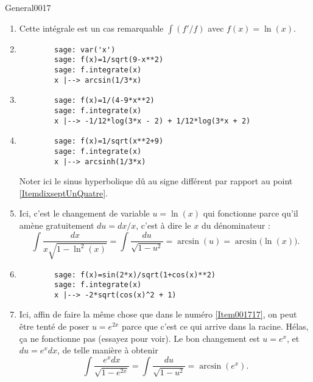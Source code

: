 \begin{corrige}{General0017}
\begin{enumerate}
\item
Cette intégrale est un cas remarquable $\int (f'/f)$ avec $f(x)=\ln(x)$.

\item\label{ItemdixseptUnQuatre}
	
	\begin{verbatim}
		sage: var('x')
		sage: f(x)=1/sqrt(9-x**2)
		sage: f.integrate(x)
		x |--> arcsin(1/3*x)
	\end{verbatim}


\item
	\begin{verbatim}
		sage: f(x)=1/(4-9*x**2)
		sage: f.integrate(x)   
		x |--> -1/12*log(3*x - 2) + 1/12*log(3*x + 2)
	\end{verbatim}
\item

	\begin{verbatim}
		sage: f(x)=1/sqrt(x**2+9)
		sage: f.integrate(x)     
		x |--> arcsinh(1/3*x)
	\end{verbatim}
	Noter ici le sinus hyperbolique dû au signe différent par rapport au point \ref{ItemdixseptUnQuatre}.
\item\label{Item001717}
Ici, c'est le changement de variable $u=\ln(x)$ qui fonctionne parce qu'il amène gratuitement $du=dx/x$, c'est à dire le $x$ du dénominateur :
\begin{equation}
	\int\frac{ dx }{ x\sqrt{1-\ln^2(x)} }=\int\frac{ du }{ \sqrt{1-u^2} }=\arcsin(u)=\arcsin\big( \ln(x) \big).
\end{equation}

\item

	\begin{verbatim}
		sage: f(x)=sin(2*x)/sqrt(1+cos(x)**2)
		sage: f.integrate(x)                 
		x |--> -2*sqrt(cos(x)^2 + 1)
	\end{verbatim}
	

\item
Ici, affin de faire la même chose que dans le numéro \ref{Item001717}, on peut être tenté de poser $u= e^{2x}$ parce que c'est ce qui arrive dans la racine. Hélas, ça ne fonctionne pas (essayez pour voir). Le bon changement est $u=e^x$, et $du= e^{x}dx$, de telle manière à obtenir
\begin{equation}
	\int\frac{  e^{x}dx }{ \sqrt{1- e^{2x}} }=\int\frac{ du }{ \sqrt{1-u^2} }=\arcsin(e^x).
\end{equation}


\end{enumerate}
\end{corrige}
